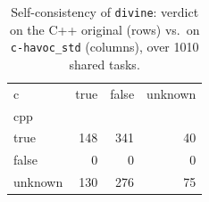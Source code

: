 \begin{table}[t]
  \centering
  \caption{Self-consistency of \texttt{divine}: verdict on the C++ original (rows) vs.\ on \texttt{c-havoc_std} (columns), over 1010 shared tasks.}
  \label{tab:selfpair-divine-c-havoc_std}
\begin{tabular}{lrrr}
\toprule
c & true & false & unknown \\
cpp &  &  &  \\
\midrule
true & 148 & 341 & 40 \\
false & 0 & 0 & 0 \\
unknown & 130 & 276 & 75 \\
\bottomrule
\end{tabular}
\end{table}
